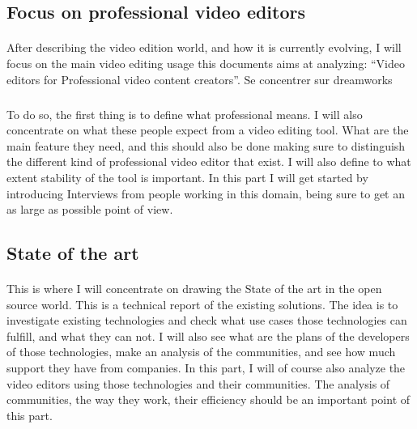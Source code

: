     \subsection{Focus on professional video editors}
        \paragraph{}
            After describing the video edition world, and how it is currently
            evolving, I will focus on the main video editing usage this documents
            aims at analyzing: ``Video editors for Professional video content
            creators''. Se concentrer sur dreamworks \cite{RobinRowe2001}

       \subparagraph{}
            To do so, the first thing is to define what professional means. I will
            also concentrate on what these people expect from a video editing tool.
            What are the main feature they need, and this should also be done
            making sure to distinguish the different kind of professional video
            editor that exist. I will also define to what extent stability of the
            tool is important. In this part I will get started by introducing
            Interviews from people working in this domain, being sure to get an
            as large as possible point of view.

    \subsection{State of the art}
       \paragraph{}
            This is where I will concentrate on drawing the State of the art in
            the open source world. This is a  technical report of the existing
            solutions.  The idea is to investigate existing technologies and
            check what use cases those technologies can fulfill, and what they
            can not. I will also see what are the plans of the developers of
            those technologies, make an analysis of the communities, and see
            how much support they have from companies. In this part, I will of
            course also analyze the video editors using those technologies and
            their communities. The analysis of communities, the way they work,
            their efficiency should be an important point of this part.

